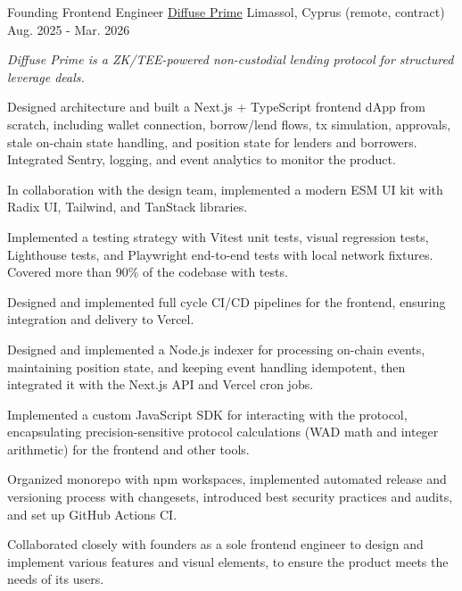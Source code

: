 \begin{cventries}
  \cventry
    {Founding Frontend Engineer} %
    {\href{https://prime.diffuse.fi/}{Diffuse Prime}} %
    {Limassol, Cyprus (remote, contract)} %
    {Aug. 2025 - Mar. 2026} %
    {
      \begin{cvitems} %
      \vspace{8pt}
      \item[] {\small\textit{Diffuse Prime is a ZK/TEE-powered non-custodial lending protocol for structured leverage deals.}}
      \vspace{8pt}
        \item {Designed architecture and built a Next.js + TypeScript frontend dApp from scratch, including wallet connection, borrow/lend flows, tx simulation, approvals, stale on-chain state handling, and position state for lenders and borrowers. Integrated Sentry, logging, and event analytics to monitor the product.}
        \item {In collaboration with the design team, implemented a modern ESM UI kit with Radix UI, Tailwind, and TanStack libraries.}
        \item {Implemented a testing strategy with Vitest unit tests, visual regression tests, Lighthouse tests, and Playwright end-to-end tests with local network fixtures. Covered more than 90\% of the codebase with tests.}
        \item {Designed and implemented full cycle CI/CD pipelines for the frontend, ensuring integration and delivery to Vercel.}
        \item {Designed and implemented a Node.js indexer for processing on-chain events, maintaining position state, and keeping event handling idempotent, then integrated it with the Next.js API and Vercel cron jobs.}
        \item {Implemented a custom JavaScript SDK for interacting with the protocol, encapsulating precision-sensitive protocol calculations (WAD math and integer arithmetic) for the frontend and other tools.}
        \item {Organized monorepo with npm workspaces, implemented automated release and versioning process with changesets, introduced best security practices and audits, and set up GitHub Actions CI.}
        \item {Collaborated closely with founders as a sole frontend engineer to design and implement various features and visual elements, to ensure the product meets the needs of its users.}
      \end{cvitems}
    }
    {\vspace{24pt}}


\end{cventries}
